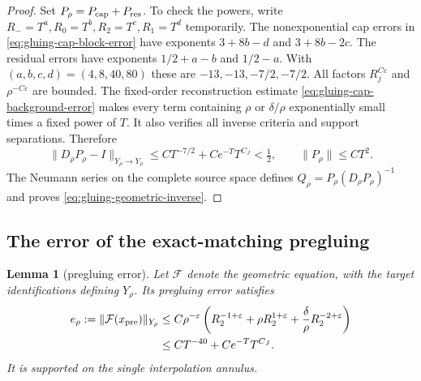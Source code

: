 \documentclass[11pt]{amsart}
\newtheorem{lemma}[theorem]{Lemma}
\theoremstyle{definition}
\theoremstyle{remark}
\theoremstyle{plain}
\begin{document}
\begin{proof}
Set $P_\rho=P_{\rm cap}+P_{\rm res}$. To check the powers,
write $R_-=T^a,R_0=T^b,R_2=T^c,R_1=T^d$ temporarily.
The nonexponential cap errors in \eqref{eq:gluing-cap-block-error}
have exponents $3+8b-d$ and $3+8b-2c$.
The residual errors have exponents $1/2+a-b$ and $1/2-a$.
With $(a,b,c,d)=(4,8,40,80)$ these are $-13,-13,-7/2,-7/2$.
All factors $R_j^{C\varepsilon}$ and $\rho^{-C\varepsilon}$
are bounded. The fixed-order reconstruction estimate
\eqref{eq:gluing-cap-background-error} makes every term containing
$\rho$ or $\delta/\rho$ exponentially small times a fixed
power of $T$. It also verifies all inverse criteria and support
separations. Therefore
\[
 \|D_\rho P_\rho-I\|_{Y_\rho\to Y_\rho}
             \leq CT^{-7/2}+Ce^{-T}T^{C_J}<\tfrac12,
 \qquad \|P_\rho\|\leq CT^2.
\]
The Neumann series on the complete source space defines
$Q_\rho=P_\rho(D_\rho P_\rho)^{-1}$ and proves
\eqref{eq:gluing-geometric-inverse}.
\end{proof}

\subsection{The error of the exact-matching pregluing}

\begin{lemma}[pregluing error]\label{lem:gluing-pregluing-error}
Let $\mathcal F$ denote the geometric equation, with the target
identifications defining $Y_\rho$. Its pregluing error satisfies
\begin{equation}\label{eq:gluing-pregluing-error}
 \begin{split}
 e_\rho:=\|\mathcal F(x_{\rm pre})\|_{Y_\rho}
 &\leq C\rho^{-\varepsilon}
     \left(R_2^{-1+\varepsilon}+\rho R_2^{1+\varepsilon}
                    +\frac\delta\rho R_2^{-2+\varepsilon}\right)\\
 &\leq CT^{-40}+Ce^{-T}T^{C_J}.
 \end{split}
\end{equation}
It is supported on the single interpolation annulus.
\end{lemma}
\end{document}
